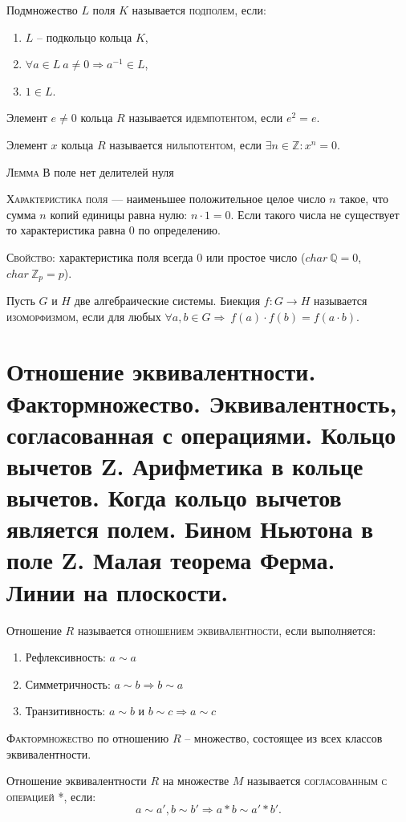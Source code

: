 \documentclass{article}
\begin{document}
Подмножество $L$ поля $K$ называется \textsc{подполем}, если:
\begin{enumerate}
    \item $L$ – подкольцо кольца $K$,
    \item $\forall a\in L\ a\neq 0\Rightarrow a^{-1}\in L$,
    \item $1\in L$.
\end{enumerate}

Элемент $e\neq 0$ кольца $R$ называется \textsc{идемпотентом}, если $e^2=e$.

Элемент $x$ кольца $R$ называется \textsc{нильпотентом}, если $\exists n\in \mathbb{Z}\colon x^n=0$.

\textsc{Лемма} В поле нет делителей нуля

\textsc{Характеристика поля} — наименьшее положительное целое число $n$ такое, что сумма $n$ копий единицы равна нулю:
$n\cdot 1=0$.
Если такого числа не существует то характеристика равна 0 по определению. 

\textsc{Свойство:} характеристика поля всегда 0 или простое число ($char\ \mathbb{Q}=0$, $char\ \mathbb{Z}_p=p$).

Пусть ${\displaystyle G\!}$ и ${\displaystyle H\!}$ две алгебраические системы. Биекция ${\displaystyle f\colon G\to H}$ называется \textsc{изоморфизмом}, если для любых ${\forall a,b\in G\Rightarrow} \ {\displaystyle f(a)\cdot f(b)=f(a\cdot b).}$

\section{Отношение эквивалентности. Фактормножество. Эквивалентность, согласованная с операциями. Кольцо вычетов Z. Арифметика в кольце вычетов. Когда кольцо вычетов является полем. Бином Ньютона в поле Z. Малая теорема Ферма. Линии на плоскости.}
Отношение $R$ называется \textsc{отношением эквивалентности}, если выполняется:
\begin{enumerate}
    \item Рефлексивность: $a\sim a$
    \item Симметричность: $a\sim b\Rightarrow b\sim a$
    \item Транзитивность: $a\sim b$ и $b\sim c\Rightarrow a\sim c$
\end{enumerate}

\textsc{Фактормножество} по отношению $R$ – множество, состоящее из всех классов эквивалентности.

Отношение эквивалентности $R$ на множестве $M$ называется \textsc{согласованным с операцией} *, если:
$$a\sim a', b\sim b' \Rightarrow a*b\sim a'*b'.$$
\end{document}
